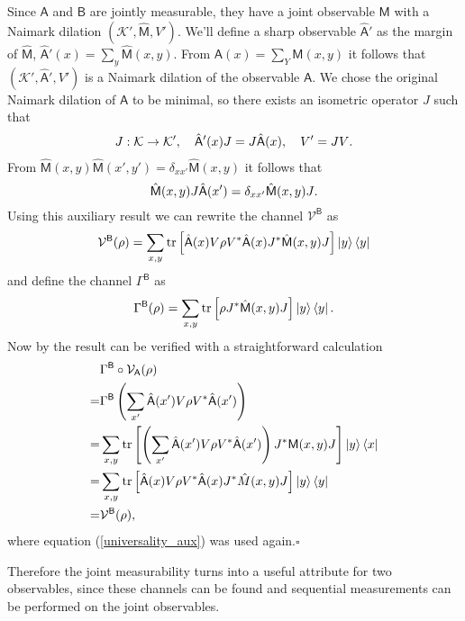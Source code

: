 \documentclass[a4paper,12pt]{wihuri}
\theoremstyle{definition}
\numberwithin{definition}{section}
\numberwithin{example}{section}
\numberwithin{theorem}{section}
\numberwithin{proposition}{section}
\numberwithin{lemma}{section}
\newcommand{\ki}{\mathcal{K}}%
\newcommand{\V}{\mathcal{V}}%
\newcommand{\A}{\mathsf{A}}%
\newcommand{\B}{\mathsf{B}}%
\newcommand{\M}{\mathsf{M}}%
\DeclareMathOperator{\tr}{tr}
\begin{document}
Since $\A$ and $\B$ are jointly measurable, they have a joint observable $\M$ with a Naimark dilation $(\ki', \hat{\M}, V')$. We'll define a sharp observable $\hat{\A}'$ as the margin of $\hat{\M}$, $\hat{\A}'(x) = \sum_y \hat{\M}(x,y)$. From $\A(x) = \sum_Y \M(x,y)$ it follows that $(\ki', \hat{\A}', V')$ is a Naimark dilation of the observable $\A$. We chose the original Naimark dilation of $\A$ to be minimal, so there exists an isometric operator $J$ such that
\begin{align*}
J : \ki \rightarrow \ki', \quad \hat{\A}'(x)J = J\hat{\A}(x), \quad V' = JV \text. 
\end{align*}
From $\hat{\M}(x,y) \hat{\M}(x', y') = \delta_{xx'}\hat{\M}(x,y)$ it follows that
\begin{equation}\label{universality_aux}
\hat{\M}(x,y)J\hat{\A}(x') = \delta_{xx'}\hat{\M}(x,y)J\text.
\end{equation}
Using this auxiliary result we can rewrite the channel $\V^{\B}$ as
\begin{align*}
\V^{\B}(\rho) = \sum_{x,y}\tr\left[\hat{\A}(x)V\rho V^*\hat{\A}(x)J^*\hat{\M}(x,y)J \right]\ket{y}\bra{y}
\end{align*}
and define the channel $\Gamma^{\B}$ as 
\begin{align*}
\Gamma^{\B}(\rho) = \sum_{x,y}\tr\left[\rho J^*\hat{\M}(x,y)J \right]\ket{y}\bra{y}\text.
\end{align*}
Now by the result can be verified with a straightforward calculation
\begin{align*}
&\Gamma^{\B} \circ \V_{\A}(\rho) \\
=&\Gamma^{\B} \left(\sum_{x'} \hat{\A}(x') V\rho V^*\hat{\A}(x') \right)\\
=&\sum_{x,y} \tr\left[\left(\sum_{x'}\hat{\A}(x')V\rho V^*\hat{\A}(x') \right)J^*\M(x,y)J \right]\ket{y}\bra{x} \\
=&\sum_{x,y}\tr\left[\hat{\A}(x)V\rho V^*\hat{\A}(x)J^*\hat{M}(x,y)J \right]\ket{y}\bra{y}\\
=& \V^{\B}(\rho),
\end{align*}
where equation (\ref{universality_aux}) was used again.\hfill $\square$


Therefore the joint measurability turns into a useful attribute for two observables, since these channels can be found and sequential measurements can be performed on the joint observables.
\end{document}
